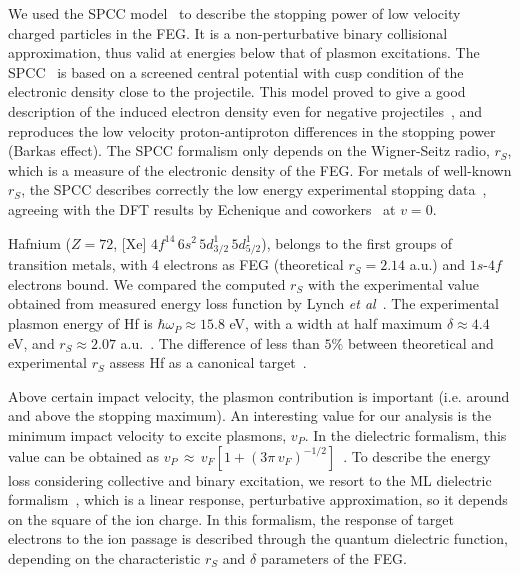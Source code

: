 \documentclass[aps,pra,reprint,groupedaddress]{revtex4-1}
\begin{document}
We used the SPCC model~\cite{mon17} to describe the stopping power of low velocity charged particles in the FEG. It is a non-perturbative binary collisional approximation, thus valid at energies below that of plasmon excitations.  The SPCC~\cite{mon17} is based on a screened central potential with cusp condition of the electronic density close to the projectile. This model proved to give a good description of the induced electron density even for negative projectiles~\cite{mon17}, and reproduces the low velocity proton-antiproton differences in the stopping power (Barkas effect). The SPCC formalism only depends on the Wigner-Seitz radio, $r_S$, which is a measure of the electronic density of the FEG. For metals of well-known $r_S$, the SPCC describes correctly the low energy experimental stopping data~\cite{mon17}, agreeing with the DFT results by Echenique and coworkers~\cite{eche81,nagy89} at $v=0$. 

Hafnium ($Z=72$, [Xe] $4f^{14}\,6s^2\,5d_{3/2}^1\,5d_{5/2}^1$), belongs to the first groups of transition metals, with  4 electrons as FEG (theoretical $r_S=2.14$ a.u.) and $1s$-$4f$ electrons bound. We compared the computed $r_S$ with the experimental value obtained from measured energy loss function by Lynch \textit{et al}~\cite{lynch75}. The experimental plasmon energy of Hf is $\hbar\omega_P \approx 15.8$ eV, with a width at half maximum $\delta \approx 4.4$ eV, and $r_S \approx 2.07$ a.u.~\cite{lynch75}. The difference of less than $5\%$ between theoretical and experimental $r_S$ assess Hf as a canonical target~\cite{mon17}.

Above certain impact velocity, the plasmon contribution is important (i.e. around and above the stopping maximum). An interesting value for our analysis is the minimum impact velocity to excite plasmons, $v_P$. In the dielectric formalism, this value can be obtained as $v_P\,\approx\,v_F[1+(3\pi\,v_F)^{-1/2}]$~\cite{suppression}. To describe the energy loss considering collective and binary excitation, we resort to the ML dielectric formalism~\cite{Mermin}, which is a linear response, perturbative approximation, so it depends on the square of the ion charge. In this formalism, the response of target electrons to the ion passage is described through the quantum dielectric function, depending on the characteristic $r_S$ and $\delta$ parameters of the FEG. 
\end{document}
